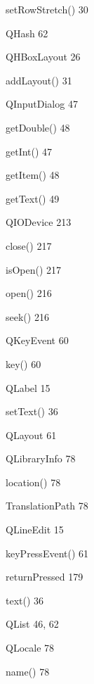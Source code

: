 \documentclass{book}
\renewcommand\subitem{\par}
\begin{document}
\begin{multicols}{2}
\begin{osp-index}
    \subitem setRowStretch()\hspace{1mm} 30
  \item QHash\hspace{1mm} 62
  \item QHBoxLayout\hspace{1mm} 26
    \subitem addLayout()\hspace{1mm} 31
  \item QInputDialog\hspace{1mm} 47
    \subitem getDouble()\hspace{1mm} 48
    \subitem getInt()\hspace{1mm} 47
    \subitem getItem()\hspace{1mm} 48
    \subitem getText()\hspace{1mm} 49
  \item QIODevice\hspace{1mm} 213
    \subitem close()\hspace{1mm} 217
    \subitem isOpen()\hspace{1mm} 217
    \subitem open()\hspace{1mm} 216
    \subitem seek()\hspace{1mm} 216
  \item QKeyEvent\hspace{1mm} 60
    \subitem key()\hspace{1mm} 60
  \item QLabel\hspace{1mm} 15
    \subitem setText()\hspace{1mm} 36
  \item QLayout\hspace{1mm} 61
  \item QLibraryInfo\hspace{1mm} 78
    \subitem location()\hspace{1mm} 78
    \subitem TranslationPath\hspace{1mm} 78
  \item QLineEdit\hspace{1mm} 15
    \subitem keyPressEvent()\hspace{1mm} 61
    \subitem returnPressed\hspace{1mm} 179
    \subitem text()\hspace{1mm} 36
  \item QList\hspace{1mm} 46, 62
  \item QLocale\hspace{1mm} 78
    \subitem name()\hspace{1mm} 78

\end{osp-index}
\end{multicols}
\end{document}
